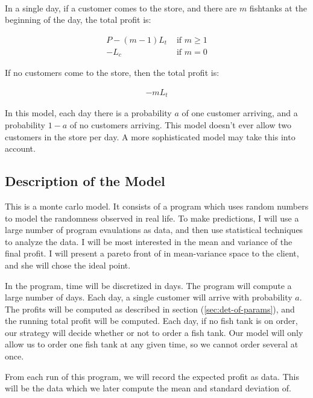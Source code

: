\documentclass{article}
\begin{document}
\paragraph{}
In a single day, if a customer comes to the store, and there are
	$m$ fishtanks at the beginning of the day, the total profit is:

\begin{align}
	P - (m - 1) L_t & \text{    if } m \geq 1 \nonumber \\
	- L_c & \text{    if } m = 0 
\end{align}

If no customers come to the store, then the total profit is:

\begin{align}
	- m L_t
\end{align}

In this model, each day there is a probability $a$ of one customer 
	arriving, and a probability $1 - a$ of no customers arriving.
This model doesn't ever allow two customers in the store per day.
A more sophisticated model may take this into account.

\subsection{Description of the Model}

This is a monte carlo model.
It consists of a program which uses random numbers to model
	the randomness observed in real life.
To make predictions, I will use a large number of program evaulations
	as data, and then use statistical techniques to analyze the data.
I will be most interested in the mean and variance of the
	final profit.
I will present a pareto front of in mean-variance space to the
	client, and she will chose the ideal point.

In the program, time will be discretized in days.
The program will compute a large number of days.
Each day, a single customer will arrive with probability $a$.
The profits will be computed as described in section
	(\ref{sec:det-of-params}), and the running total profit will be
	computed.
Each day, if no fish tank is on order, our strategy will decide whether 
	or not to order a fish tank.
Our model will only allow us to order one fish tank at any given time,
	so we cannot order several at once.

From each run of this program, we will record the expected profit
	as data.
This will be the data which we later compute the mean and standard
	deviation of.
\end{document}
